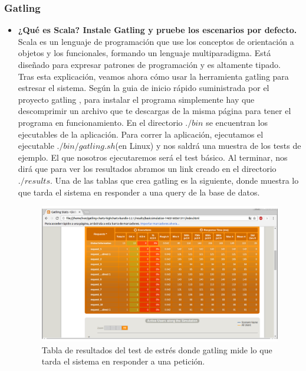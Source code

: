 \subsubsection{Gatling}
\begin{itemize}
	\item \textbf{¿Qué es Scala? Instale Gatling y pruebe los escenarios por defecto.}\\
	Scala \cite{scala} es un lenguaje de programación que use los conceptos de orientación a objetos y los funcionales, formando un lenguaje multiparadigma. Está diseñado para expresar patrones de programación y es altamente tipado.\\
	Tras esta explicación, veamos ahora cómo usar la herramienta gatling para estresar el sistema. Según la guia de inicio rápido suministrada por el proyecto gatling \cite{gatling}, para instalar el programa simplemente hay que descomprimir un archivo que te descargas de la misma página para tener el programa en funcionamiento. En el directorio $./bin$ se encuentran los ejecutables de la aplicación. Para correr la aplicación, ejecutamos el ejecutable $./bin/gatling.sh$(en Linux) y nos saldrá una muestra de los tests de ejemplo. El que nosotros ejecutaremos será el test básico. Al terminar, nos dirá que para ver los resultados abramos un link creado en el directorio $./results$. Una de las tablas que crea gatling es la siguiente, donde muestra lo que tarda el sistema en responder a una query de la base de datos.\\
	\begin{figure}[H]
		\centering
		\includegraphics[width=0.7\linewidth]{Gatling_results1}
		\caption[Table resultados]{Tabla de resultados del test de estrés donde gatling mide lo que tarda el sistema en responder a una petición.}
		\label{fig:Gatling_results1}
	\end{figure}
	

\end{itemize}
